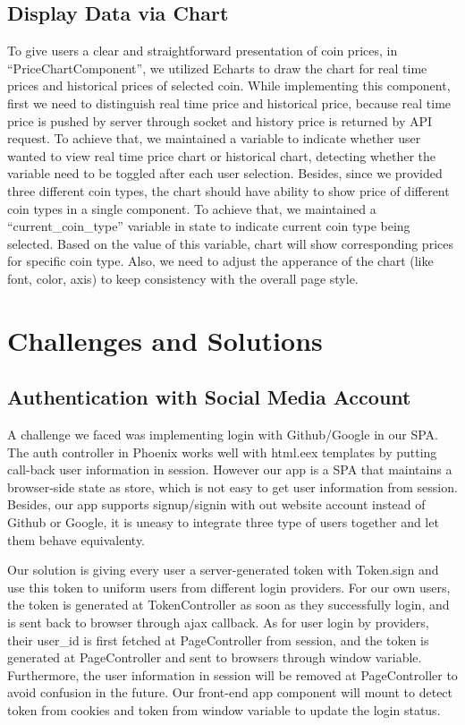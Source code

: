 \subsection{Display Data via Chart}
To give users a clear and straightforward presentation of 
coin prices, in “PriceChartComponent”, we utilized Echarts 
to draw the chart for real time prices and historical prices 
of selected coin. While implementing this component, first we 
need to distinguish real time price and historical price, 
because real time price is pushed by server through socket 
and history price is returned by API request. To achieve that, 
we maintained a variable to indicate whether user wanted to 
view real time price chart or historical chart, detecting 
whether the variable need to be toggled after each user 
selection. Besides, since we provided three different coin 
types, the chart should have ability to show price of different 
coin types in a single component. To achieve that, we maintained 
a “current\_coin\_type” variable in state to indicate current 
coin type being selected. Based on the value of this variable, 
chart will show corresponding prices for specific coin type. 
Also, we need to adjust the apperance of the chart (like 
font, color, axis) to keep consistency with the overall page style.


\section{Challenges and Solutions}
\subsection{Authentication with Social Media Account}
A challenge we faced was implementing login with Github/Google 
in our SPA. The auth controller in Phoenix works well with 
html.eex templates by putting call-back user information in 
session. However our app is a SPA that maintains a browser-side 
state as store, which is not easy to get user information from 
session. Besides, our app supports signup/signin with out website
account instead of Github or Google, it is uneasy to integrate 
three type of users together and let them behave equivalenty.

Our solution is giving every user a server-generated token with 
Token.sign and use this token to uniform users from different 
login providers. For our own users, the token is generated at 
TokenController as soon as they successfully login, and is sent 
back to browser through ajax callback. As for user login by 
providers, their user\_id is first fetched at PageController 
from session, and the token is generated at PageController and 
sent to browsers through window variable. Furthermore, the user 
information in session will be removed at PageController to avoid 
confusion in the future. Our front-end app component will mount 
to detect token from cookies and token from window variable to 
update the login status.

